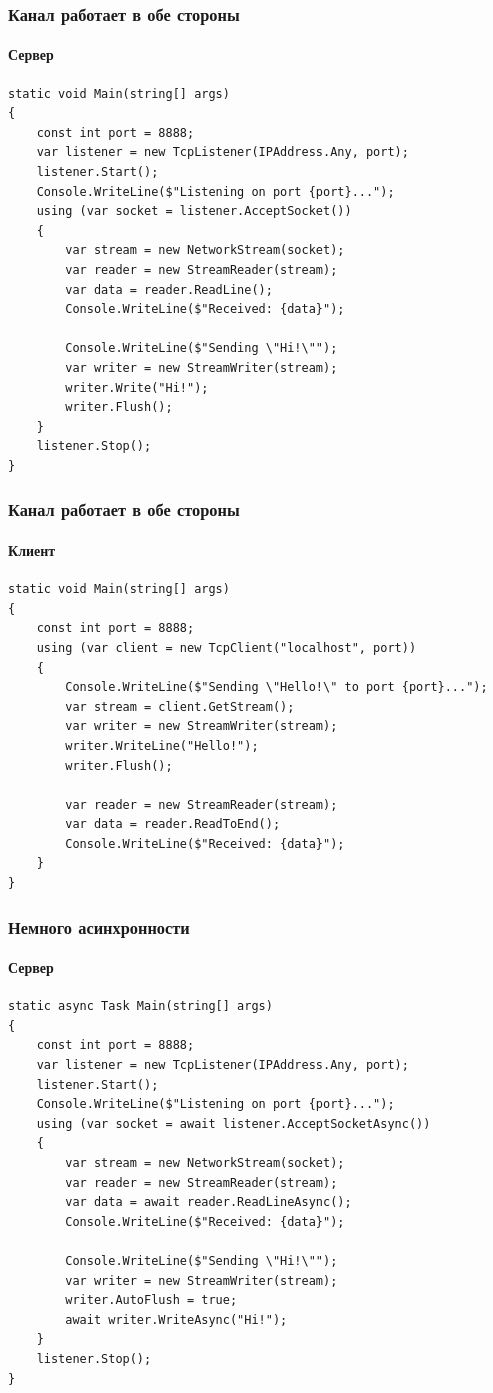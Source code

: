 \documentclass[xetex,mathserif,serif]{beamer}
\begin{document}
	\begin{frame}[fragile]
		\frametitle{Канал работает в обе стороны}
		\framesubtitle{Сервер}
		\begin{scriptsize}
			\begin{verbatim}
static void Main(string[] args)
{
    const int port = 8888;
    var listener = new TcpListener(IPAddress.Any, port);
    listener.Start();
    Console.WriteLine($"Listening on port {port}...");
    using (var socket = listener.AcceptSocket())
    {
        var stream = new NetworkStream(socket);
        var reader = new StreamReader(stream);
        var data = reader.ReadLine();
        Console.WriteLine($"Received: {data}");

        Console.WriteLine($"Sending \"Hi!\"");
        var writer = new StreamWriter(stream);
        writer.Write("Hi!");
        writer.Flush();
    }
    listener.Stop();
}
			\end{verbatim}
		\end{scriptsize}
	\end{frame}

	\begin{frame}[fragile]
		\frametitle{Канал работает в обе стороны}
		\framesubtitle{Клиент}
		\begin{footnotesize}
			\begin{verbatim}
static void Main(string[] args)
{
    const int port = 8888;
    using (var client = new TcpClient("localhost", port))
    {
        Console.WriteLine($"Sending \"Hello!\" to port {port}...");
        var stream = client.GetStream();
        var writer = new StreamWriter(stream);
        writer.WriteLine("Hello!");
        writer.Flush();

        var reader = new StreamReader(stream);
        var data = reader.ReadToEnd();
        Console.WriteLine($"Received: {data}");
    }
}
			\end{verbatim}
		\end{footnotesize}
	\end{frame}

	\begin{frame}[fragile]
		\frametitle{Немного асинхронности}
		\framesubtitle{Сервер}
		\begin{scriptsize}
			\begin{verbatim}
static async Task Main(string[] args)
{
    const int port = 8888;
    var listener = new TcpListener(IPAddress.Any, port);
    listener.Start();
    Console.WriteLine($"Listening on port {port}...");
    using (var socket = await listener.AcceptSocketAsync())
    {
        var stream = new NetworkStream(socket);
        var reader = new StreamReader(stream);
        var data = await reader.ReadLineAsync();
        Console.WriteLine($"Received: {data}");

        Console.WriteLine($"Sending \"Hi!\"");
        var writer = new StreamWriter(stream);
        writer.AutoFlush = true;
        await writer.WriteAsync("Hi!");
    }
    listener.Stop();
}
			\end{verbatim}
		\end{scriptsize}
	\end{frame}
\end{document}

